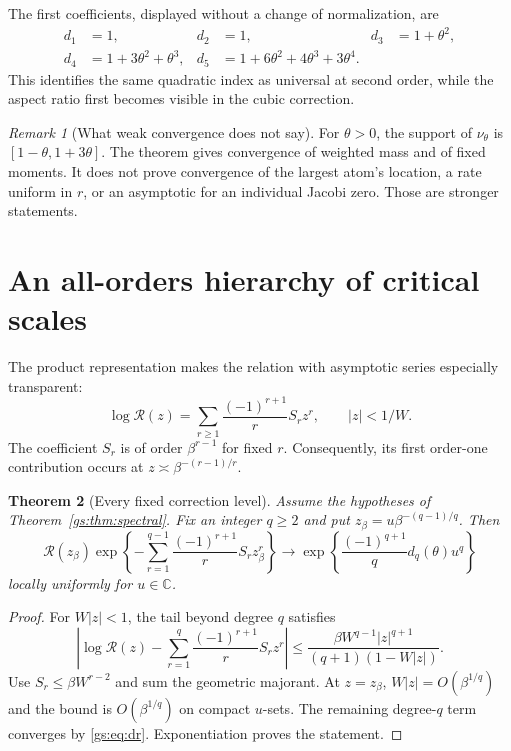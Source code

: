 \documentclass[11pt,a4paper]{article}
\numberwithin{equation}{section}
\newtheorem{theorem}{Theorem}[section]
\theoremstyle{definition}
\theoremstyle{remark}
\newtheorem{remark}[theorem]{Remark}
\newcommand{\CC}{\mathbb C}
\newcommand{\Rgs}{\mathcal R}
\begin{document}
The first coefficients, displayed without a change of normalization, are
\begin{align}\label{gs:eq:first-dr}
 d_1&=1,&d_2&=1,&d_3&=1+\theta^2,\\
 d_4&=1+3\theta^2+\theta^3,&
 d_5&=1+6\theta^2+4\theta^3+3\theta^4.\nonumber
\end{align}
This identifies the same quadratic index as universal at second order,
while the aspect ratio first becomes visible in the cubic correction.

\begin{remark}[What weak convergence does not say]
For $\theta>0$, the support of $\nu_\theta$ is
$[1-\theta,1+3\theta]$. The theorem gives convergence of weighted mass
and of fixed moments. It does not prove convergence of the largest atom's
location, a rate uniform in $r$, or an asymptotic for an individual Jacobi
zero. Those are stronger statements.
\end{remark}

\section{An all-orders hierarchy of critical scales}
\label{gs:sec:hierarchy}

The product representation makes the relation with asymptotic series
especially transparent:
\begin{equation}\label{gs:eq:logseries}
 \log\Rgs(z)=\sum_{r\ge1}\frac{(-1)^{r+1}}r S_rz^r,
 \qquad |z|<1/W.
\end{equation}
The coefficient $S_r$ is of order $\beta^{r-1}$ for fixed $r$.
Consequently, its first order-one contribution occurs at
$z\asymp\beta^{-(r-1)/r}$.

\begin{theorem}[Every fixed correction level]\label{gs:thm:hierarchy}
Assume the hypotheses of Theorem~\ref{gs:thm:spectral}. Fix an integer $q\ge2$
and put $z_\beta=u\beta^{-(q-1)/q}$. Then
\begin{equation}\label{gs:eq:hierarchy}
 \Rgs(z_\beta)
 \exp\!\left\{-\sum_{r=1}^{q-1}
       \frac{(-1)^{r+1}}rS_rz_\beta^r\right\}
 \longrightarrow
 \exp\!\left\{\frac{(-1)^{q+1}}q d_q(\theta)u^q\right\}
\end{equation}
locally uniformly for $u\in\CC$.
\end{theorem}
\begin{proof}
For $W|z|<1$, the tail beyond degree $q$ satisfies
\begin{equation}\label{gs:eq:q-tail}
 \left|\log\Rgs(z)-\sum_{r=1}^q
        \frac{(-1)^{r+1}}rS_rz^r\right|
 \le\frac{\beta W^{q-1}|z|^{q+1}}
           {(q+1)(1-W|z|)}.
\end{equation}
Use $S_r\le\beta W^{r-2}$ and sum the geometric majorant.
At $z=z_\beta$, $W|z|=O(\beta^{1/q})$ and the bound is
$O(\beta^{1/q})$ on compact $u$-sets. The remaining degree-$q$ term
converges by \eqref{gs:eq:dr}. Exponentiation proves the statement.
\end{proof}
\end{document}
